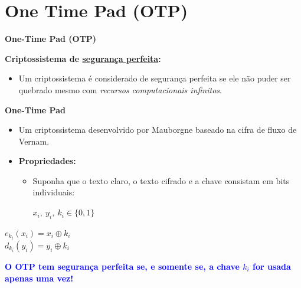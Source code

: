 \documentclass{beamer}
\begin{document}
\section{One Time Pad (OTP)}
\begin{frame}{\textbf{One-Time Pad (OTP)}}

\textbf{Criptossistema de \underline{segurança perfeita}:}
\begin{itemize}
  \item \small{Um criptossistema é considerado de segurança perfeita se ele não puder ser quebrado mesmo com \textit{recursos computacionais infinitos}.}
\end{itemize}

\textbf{One-Time Pad}
\begin{itemize}
  \item \small{Um criptossistema desenvolvido por Mauborgne baseado na cifra de fluxo de Vernam.}
  \item \textbf{Propriedades:}
  \begin{itemize}
    \item \small{Suponha que o texto claro, o texto cifrado e a chave consistam em bits individuais:}\\
    \begin{center}
        $x_i,\ y_i,\ k_i \in \{0,1\}$
    \end{center}
  \end{itemize}
\end{itemize}
\vspace{-0.5em}
\begin{tcolorbox}[colframe=red!50!black, colback=white!95!white, title=Funções de Criptografia]
\begin{center}
     \quad $e_{k_i}(x_i) = x_i \oplus k_i$\\
     \quad $d_{k_i}(y_i) = y_i \oplus k_i$    
\end{center}
\end{tcolorbox}

\textbf{\textcolor{blue}{O OTP tem segurança perfeita se, e somente se, a chave $k_i$ for usada apenas uma vez!}}

\end{frame}

\end{document}
